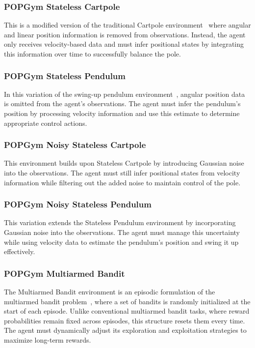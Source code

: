 \subsubsection{POPGym Stateless Cartpole}
This is a modified version of the traditional Cartpole environment~\citep{6313077} where angular and linear position information is removed from observations. Instead, the agent only receives velocity-based data and must infer positional states by integrating this information over time to successfully balance the pole.

\subsubsection{POPGym Stateless Pendulum}
In this variation of the swing-up pendulum environment~\citep{Doya1995TemporalDL}, angular position data is omitted from the agent's observations. The agent must infer the pendulum's position by processing velocity information and use this estimate to determine appropriate control actions.

\subsubsection{POPGym Noisy Stateless Cartpole}
This environment builds upon Stateless Cartpole by introducing Gaussian noise into the observations. The agent must still infer positional states from velocity information while filtering out the added noise to maintain control of the pole.

\subsubsection{POPGym Noisy Stateless Pendulum}
This variation extends the Stateless Pendulum environment by incorporating Gaussian noise into the observations. The agent must manage this uncertainty while using velocity data to estimate the pendulum's position and swing it up effectively.

\subsubsection{POPGym Multiarmed Bandit}
The Multiarmed Bandit environment is an episodic formulation of the multiarmed bandit problem~\citep{slivkins2024introductionmultiarmedbandits}, where a set of bandits is randomly initialized at the start of each episode. Unlike conventional multiarmed bandit tasks, where reward probabilities remain fixed across episodes, this structure resets them every time. The agent must dynamically adjust its exploration and exploitation strategies to maximize long-term rewards.

